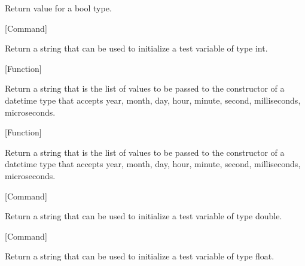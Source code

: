 \begin{doc-string}
Return  value for a bool type.
\end{doc-string}

\vspace{1em}
\noindent
{}
\usebox{\funcname}
 \hfill [Command]

\begin{doc-string}
Return a string that can be used to initialize a test variable of type int.
\end{doc-string}

\vspace{1em}
\noindent
{}
\usebox{\funcname}
 \hfill [Function]

\begin{doc-string}
Return a string that is the list of values to be passed to the constructor of
 a datetime type that accepts year, month, day, hour, minute, second,
 milliseconds, microseconds.
\end{doc-string}

\vspace{1em}
\noindent
{}
\usebox{\funcname}
 \hfill [Function]

\begin{doc-string}
Return a string that is the list of values to be passed to the constructor of
 a datetime type that accepts year, month, day, hour, minute, second,
 milliseconds, microseconds.
\end{doc-string}

\vspace{1em}
\noindent
{}
\usebox{\funcname}
 \hfill [Command]

\begin{doc-string}
Return a string that can be used to initialize a test variable of type double.
\end{doc-string}

\vspace{1em}
\noindent
{}
\usebox{\funcname}
 \hfill [Command]

\begin{doc-string}
Return a string that can be used to initialize a test variable of type float.
\end{doc-string}


